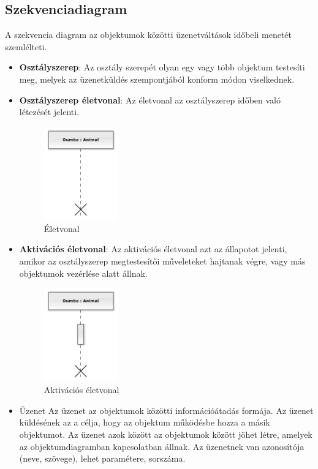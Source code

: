 \documentclass[12pt,margin=0px]{article}
\begin{document}
	\subsection*{Szekvenciadiagram}

    A szekvencia diagram az objektumok közötti üzenetváltások időbeli menetét szemlélteti.
    \begin{itemize}
			\item \textbf{Osztályszerep}:
                Az osztály szerepét olyan egy vagy több objektum testesíti meg, melyek az üzenetküldés szempontjából konform módon viselkednek.
            \item \textbf{Osztályszerep életvonal}:
			    Az életvonal az osztályszerep időben való létezését jelenti.
				\begin{figure}[H]
					\centering
					\includegraphics[width=0.3\textwidth]{img/eletvonal.png}
					\caption{Életvonal}
				\end{figure}
			\item \textbf{Aktivációs életvonal}:
                Az aktivációs életvonal azt az állapotot jelenti, amikor az osztályszerep megtestesítői műveleteket hajtanak végre, vagy más objektumok vezérlése alatt állnak.
				\begin{figure}[H]
					\centering
					\includegraphics[width=0.3\textwidth]{img/aktivacios_eletvonal.png}
					\caption{Aktivációs életvonal}
				\end{figure}
			\item Üzenet
                Az üzenet az objektumok közötti információátadás formája. Az üzenet küldésének az a célja, hogy az objektum működésbe hozza a másik objektumot. Az üzenet azok között az objektumok között jöhet létre, amelyek az objektumdiagramban kapcsolatban állnak. Az üzenetnek van azonosítója (neve, szövege), lehet paramétere, sorszáma.

\end{itemize}
\end{document}
